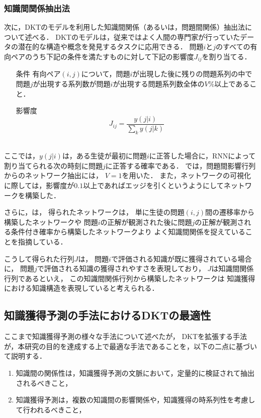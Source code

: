 \subsubsection{知識間関係抽出法}
次に，DKTのモデルを利用した知識間関係（あるいは，問題間関係）抽出法について述べる．
DKTのモデルは，従来ではよく人間の専門家が行っていたデータの潜在的な構造や概念を発見するタスクに応用できる．
問題$i$と$j$のすべての有向ペアのうち下記の条件を満たすものに対して下記の影響度$J_{ij}$を割り当てる．\\
\begin{itemize}
	\item [条件]有向ペア$(i, j)$について，問題$i$が出現した後に残りの問題系列の中で問題$j$が出現する系列数が問題$i$が出現する問題系列数全体の$V\%$以上であること．
	\item[影響度]
$$J_{ij} = \frac{y(j|i)}{\sum_k y(j|k)}$$\\
\end{itemize}
ここでは，$y(j|i)$は，ある生徒が最初に問題$i$に正答した場合に，RNNによって割り当てられる次の時刻に問題$j$に正答する確率である．
\cite{piech2015deep}では，問題間影響行列からのネットワーク抽出には，
$V=1$を用いた．
また，ネットワークの可視化に際しては，影響度が$0.1$以上であればエッジを引くというようにしてネットワークを構築した．

さらに，\cite{piech2015deep}は，
得られたネットワークは，
単に生徒の問題$(i, j)$間の遷移率から構築したネットワークや
問題$i$の正解が観測された後に問題$j$の正解が観測される条件付き確率から構築したネットワークより
よく知識間関係を捉えていることを指摘している．


こうして得られた行列$J$は，
問題$i$で評価される知識が既に獲得されている場合に，
問題$j$で評価される知識の獲得されやすさを表現しており，
$J$は知識間関係行列であるといえ，
この知識間関係行列から構築したネットワークは
知識獲得における知識構造を表現していると考えられる．


\subsection{知識獲得予測の手法におけるDKTの最適性}

ここまで知識獲得予測の様々な手法について述べたが，
DKTを拡張する手法が，本研究の目的を達成する上で最適な手法であることを，以下の二点に基づいて説明する．

\begin{enumerate}
	\item 知識間の関係性は，知識獲得予測の文脈において，定量的に検証されて抽出されるべきこと，
	\item 知識獲得予測は，複数の知識間の影響関係や，知識獲得の時系列性を考慮して行われるべきこと，
\end{enumerate}

